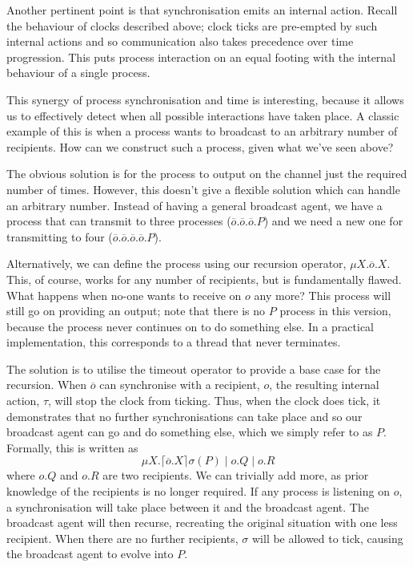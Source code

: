 \documentclass{sig-alternate}
\newcommand{\stimeout}[3]{\lceil{#1}\rceil {#2} ({#3})}
\begin{document}
Another pertinent point is that synchronisation emits an internal
action.  Recall the behaviour of clocks described above; clock ticks are
pre-empted by such internal actions and so communication also takes
precedence over time progression.  This puts process interaction on an
equal footing with the internal behaviour of a single process.

This synergy of process synchronisation and time is interesting, because
it allows us to effectively detect when all possible interactions have
taken place.  A classic example of this is when a process wants to
broadcast to an arbitrary number of recipients.  How can we construct
such a process, given what we've seen above?

The obvious solution is for the process to output on the channel just
the required number of times.  However, this doesn't give a flexible
solution which can handle an arbitrary number.  Instead of having a
general broadcast agent, we have a process that can transmit to three
processes ($\overline{o}.\overline{o}.\overline{o}.P$) and we need a new
one for transmitting to four
($\overline{o}.\overline{o}.\overline{o}.\overline{o}.P$).

Alternatively, we can define the process using our recursion operator,
$\mu X.\overline{o}.X$.  This, of course, works for any number of
recipients, but is fundamentally flawed.  What happens when no-one wants
to receive on $o$ any more?  This process will still go on providing an
output; note that there is no $P$ process in this version, because the
process never continues on to do something else.  In a practical
implementation, this corresponds to a thread that never terminates.

The solution is to utilise the timeout operator to provide a base case
for the recursion.  When $\overline{o}$ can synchronise with a
recipient, $o$, the resulting internal action, $\tau$, will stop the
clock from ticking.  Thus, when the clock does tick, it demonstrates
that no further synchronisations can take place and so our broadcast
agent can go and do something else, which we simply refer to as $P$.
Formally, this is written as
\begin{displaymath} 
\mu X.\stimeout{\overline{o}.X}{\sigma}{P} \mid o.Q \mid o.R
\end{displaymath}
where $o.Q$ and $o.R$ are two recipients.  We can trivially add more, as
prior knowledge of the recipients is no longer required.  If any process
is listening on $o$, a synchronisation will take place between it and
the broadcast agent.  The broadcast agent will then recurse, recreating
the original situation with one less recipient.  When there are no
further recipients, $\sigma$ will be allowed to tick, causing the
broadcast agent to evolve into $P$.
\end{document}
